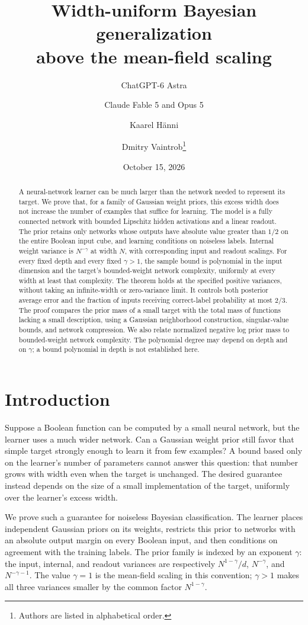 \documentclass[11pt]{article}
\title{Width-uniform Bayesian generalization\\above the mean-field scaling}
\author{ChatGPT-6 Astra \and Claude Fable 5 and Opus 5 \and Kaarel H\"anni \and Dmitry Vaintrob\thanks{Authors are listed in alphabetical order.}}
\date{October 15, 2026}
\theoremstyle{definition}
\begin{document}
\maketitle
\begin{abstract}
A neural-network learner can be much larger than the network needed to
represent its target. We prove that, for a family of Gaussian weight priors,
this excess width does not increase the number of examples that suffice for learning.
The model is a fully connected network with bounded Lipschitz hidden
activations and a linear readout. The prior retains only networks whose
outputs have absolute value greater than $1/2$ on the entire Boolean input
cube, and learning conditions on noiseless labels. Internal weight variance
is $N^{-\gamma}$ at width $N$, with corresponding input and readout scalings.
For every fixed depth and every fixed $\gamma>1$, the sample bound is
polynomial in the input dimension and the target's bounded-weight network
complexity, uniformly at every width at least that complexity. The theorem
holds at the specified positive variances, without taking an infinite-width
or zero-variance limit. It controls both posterior average error and the
fraction of inputs receiving correct-label probability at most $2/3$.
The proof compares the prior mass of a small target with the total mass of
functions lacking a small description, using a Gaussian neighborhood
construction, singular-value bounds, and network compression. We also relate
normalized negative log prior mass to bounded-weight network complexity.
The polynomial degree may depend on depth and on $\gamma$; a bound polynomial
in depth is not established here.
\end{abstract}

\section{Introduction}
Suppose a Boolean function can be computed by a small neural network, but
the learner uses a much wider network. Can a Gaussian weight prior still
favor that simple target strongly enough to learn it from few examples?
A bound based only on the learner's number of parameters cannot answer this
question: that number grows with width even when the target is unchanged.
The desired guarantee instead depends on the size of a small implementation
of the target, uniformly over the learner's excess width.

We prove such a guarantee for noiseless Bayesian classification. The learner
places independent Gaussian priors on its weights, restricts this prior to
networks with an absolute output margin on every Boolean input, and then
conditions on agreement with the training labels. The prior family is
indexed by an exponent $\gamma$: the input, internal, and readout variances
are respectively $N^{1-\gamma}/d$, $N^{-\gamma}$, and $N^{-\gamma-1}$.
The value $\gamma=1$ is the mean-field scaling in this convention;
$\gamma>1$ makes all three variances smaller by the common factor
$N^{1-\gamma}$.
\end{document}
